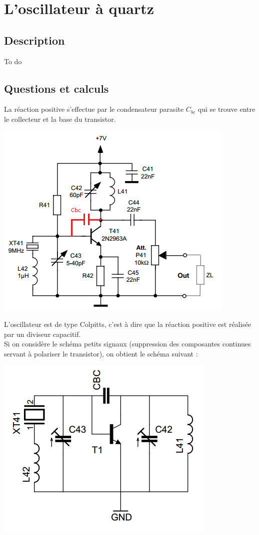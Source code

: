 \documentclass{article}
\begin{document}
\section{L'oscillateur à quartz}

\subsection{Description}
To do

\subsection{Questions et calculs}


La réaction positive s'effectue par le condensateur parasite $C_{bc}$ qui se trouve entre le collecteur et la base du transistor.
\begin{center}
\includegraphics[width = 0.7\linewidth]{shema_oscillateur.png}
\end{center}
L'oscillateur est de type Colpitts, c'est à dire que la réaction positive est réalisée par un diviseur capacitif.\\
Si on considère le schéma petits signaux (suppression des composantes continues servant à polariser le transistor), on obtient le schéma suivant :
\begin{center}
\includegraphics[width=0.4\linewidth]{shema_petit_signaux_oscillateur.png}
\end{center}
\end{document}
